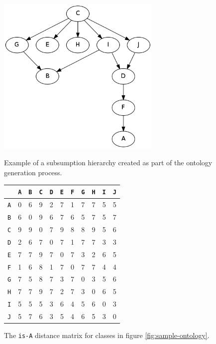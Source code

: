 \begin{figure}[t]
\begin{minipage}[b]{0.5\linewidth}
\centering
\includegraphics[width=0.7\textwidth]{media/chapter6/sample-ontology.png}
\caption{Example of a subsumption hierarchy created as part of the ontology generation process.}
\label{fig:sample-ontology}
\end{minipage}
\hspace{0.5cm}
\begin{minipage}[b]{0.45\linewidth}

\begin{tabular}{ |c|c|c|c|c|c|c|c|c|c|c| }
  \hline
  & \texttt{A} & \texttt{B} & \texttt{C} & \texttt{D} & \texttt{E} & \texttt{F} & \texttt{G} & \texttt{H} & \texttt{I} & \texttt{J} \\
  \hline
    \texttt{A}  &  0  &  6  &  9  &  2  &  7  &  1  &  7  &  7  &  5  &  5 \\
    \texttt{B}  &  6  &  0  &  9  &  6  &  7  &  6  &  5  &  7  &  5  &  7 \\
    \texttt{C}  &  9  &  9  &  0  &  7  &  9  &  8  &  8  &  9  &  5  &  6 \\
    \texttt{D}  &  2  &  6  &  7  &  0  &  7  &  1  &  7  &  7  &  3  &  3 \\
    \texttt{E}  &  7  &  7  &  9  &  7  &  0  &  7  &  3  &  2  &  6  &  5 \\
    \texttt{F}  &  1  &  6  &  8  &  1  &  7  &  0  &  7  &  7  &  4  &  4 \\
    \texttt{G}  &  7  &  5  &  8  &  7  &  3  &  7  &  0  &  3  &  5  &  6 \\
    \texttt{H}  &  7  &  7  &  9  &  7  &  2  &  7  &  3  &  0  &  6  &  5 \\
    \texttt{I}  &  5  &  5  &  5  &  3  &  6  &  4  &  5  &  6  &  0  &  3 \\
    \texttt{J}  &  5  &  7  &  6  &  3  &  5  &  4  &  6  &  5  &  3  &  0 \\
  \hline
\end{tabular}
\caption{The \texttt{is-A} distance matrix for classes in figure \ref{fig:sample-ontology}.}
\label{tbl:semantic-distance}
\end{minipage}
\end{figure}


